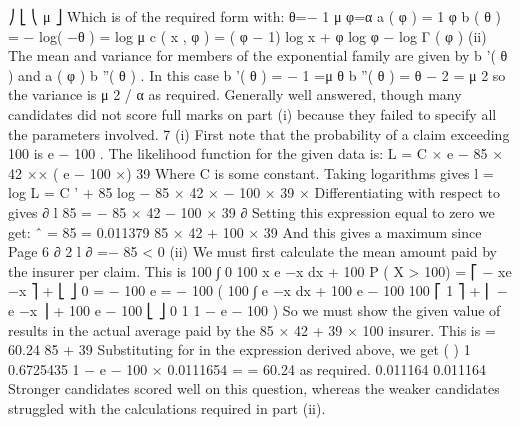 \documentclass[a4paper,12pt]{article}
\begin{document}
⎠
⎣ ⎝ μ
⎦
Which is of the required form with:
θ=−
1
μ
φ=α
a ( φ ) =
1
φ
b ( θ ) = − log( −θ ) = log μ
c ( x , φ ) = ( φ − 1) log x + φ log φ − log Γ ( φ )
(ii)
The mean and variance for members of the exponential family are given by
b '( θ ) and a ( φ ) b ''( θ ) .
In this case b '( θ ) = −
1
=μ
θ
b ''( θ ) = θ − 2 = μ 2 so the variance is μ 2 / α as required.
Generally well answered, though many candidates did not score full marks on part (i)
because they failed to specify all the parameters involved.
7
(i)
First note that the probability of a claim exceeding 100 is e − 100 \lambda  .
The likelihood function for the given data is:
L = C ×  e − 85 × 42 ×\lambda  × ( e − 100 ×\lambda  ) 39
Where C is some constant. Taking logarithms gives
l = log L = C ' + 85 log \lambda  − 85 × 42 × \lambda  − 100 × 39 × \lambda 
Differentiating with respect to \lambda  gives
∂ l 85
=
− 85 × 42 − 100 × 39
∂\lambda  \lambda 
Setting this expression equal to zero we get:
\lambda  ˆ =
85
= 0.011379
85 × 42 + 100 × 39
And this gives a maximum since
Page 6
∂ 2 l
∂
=−
85
< 0
(ii)
We must first calculate the mean amount paid by the insurer per claim. This is
100
∫
0
100
x \lambda  e −\lambda  x dx + 100 P ( X > 100) = ⎡ − xe −\lambda  x ⎤ +
⎣
⎦ 0
= − 100 e
=
− 100 \lambda 
(
100
∫ e
−\lambda  x
dx + 100 e − 100 
100
⎡ 1
⎤
+ ⎢ − e −\lambda  x ⎥ + 100 e − 100 \lambda 
⎣ \lambda 
⎦ 0
1
1 − e − 100 \lambda 
\lambda 
)
So we must show the given value of \lambda  results in the actual average paid by the
85 × 42 + 39 × 100
insurer. This is
= 60.24
85 + 39
Substituting for \lambda  in the expression derived above, we get
(
)
1
0.6725435
1 − e − 100 × 0.0111654 =
= 60.24 as required.
0.011164
0.011164
Stronger candidates scored well on this question, whereas the weaker candidates struggled
with the calculations required in part (ii).
\end{document}

